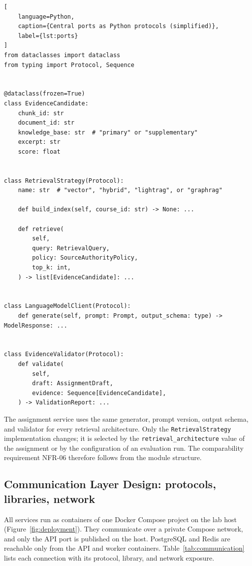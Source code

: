 \documentclass[12pt,a4paper]{article}
\begin{document}
\begin{lstlisting}[
    language=Python,
    caption={Central ports as Python protocols (simplified)},
    label={lst:ports}
]
from dataclasses import dataclass
from typing import Protocol, Sequence


@dataclass(frozen=True)
class EvidenceCandidate:
    chunk_id: str
    document_id: str
    knowledge_base: str  # "primary" or "supplementary"
    excerpt: str
    score: float


class RetrievalStrategy(Protocol):
    name: str  # "vector", "hybrid", "lightrag", or "graphrag"

    def build_index(self, course_id: str) -> None: ...

    def retrieve(
        self,
        query: RetrievalQuery,
        policy: SourceAuthorityPolicy,
        top_k: int,
    ) -> list[EvidenceCandidate]: ...


class LanguageModelClient(Protocol):
    def generate(self, prompt: Prompt, output_schema: type) -> ModelResponse: ...


class EvidenceValidator(Protocol):
    def validate(
        self,
        draft: AssignmentDraft,
        evidence: Sequence[EvidenceCandidate],
    ) -> ValidationReport: ...
\end{lstlisting}

The assignment service uses the same generator, prompt version,
output schema, and validator for every retrieval architecture. Only
the \texttt{RetrievalStrategy} implementation changes; it is selected
by the \texttt{retrieval\_architecture} value of the assignment or by
the configuration of an evaluation run. The comparability
requirement NFR-06 therefore follows from the module structure.

\subsection{Communication Layer Design: protocols, libraries, network}
\label{sec:architecture-communication}

All services run as containers of one Docker Compose project on the
lab host (Figure~\ref{fig:deployment}). They communicate over a
private Compose network, and only the API port is published on the
host. PostgreSQL and Redis are reachable only from the API and
worker containers. Table~\ref{tab:communication} lists each
connection with its protocol, library, and network exposure.
\end{document}
